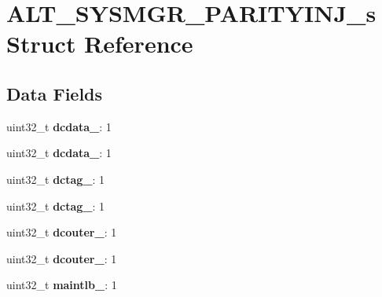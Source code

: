 \hypertarget{structALT__SYSMGR__PARITYINJ__s}{}\section{A\+L\+T\+\_\+\+S\+Y\+S\+M\+G\+R\+\_\+\+P\+A\+R\+I\+T\+Y\+I\+N\+J\+\_\+s Struct Reference}
\label{structALT__SYSMGR__PARITYINJ__s}
\subsection*{Data Fields}
\begin{DoxyCompactItemize}
\item 
\mbox{\label{structALT__SYSMGR__PARITYINJ__s_a3ed85f2d562b9a693c1386f286b104b6}} 
uint32\+\_\+t {\bfseries dcdata\+\_}\+: 1
\item 
\mbox{\label{structALT__SYSMGR__PARITYINJ__s_a4fa96838ecf4bffd9a3acaeb564a2132}} 
uint32\+\_\+t {\bfseries dcdata\+\_}\+: 1
\item 
\mbox{\label{structALT__SYSMGR__PARITYINJ__s_ac8bacf9485ec83e760927d70564068d1}} 
uint32\+\_\+t {\bfseries dctag\+\_}\+: 1
\item 
\mbox{\label{structALT__SYSMGR__PARITYINJ__s_a5fca94339455940c6a8aae10f8850d2b}} 
uint32\+\_\+t {\bfseries dctag\+\_}\+: 1
\item 
\mbox{\label{structALT__SYSMGR__PARITYINJ__s_a39ae8d1b2082937f73ff235fb7254e1b}} 
uint32\+\_\+t {\bfseries dcouter\+\_}\+: 1
\item 
\mbox{\label{structALT__SYSMGR__PARITYINJ__s_a4a0a26fee7aa247e9e7788a0d076c213}} 
uint32\+\_\+t {\bfseries dcouter\+\_}\+: 1
\item 
\mbox{\label{structALT__SYSMGR__PARITYINJ__s_a6763fe41e4ce2db3ac80337547ae92b5}} 
uint32\+\_\+t {\bfseries maintlb\+\_}\+: 1
\item 
\mbox{\label{structALT__SYSMGR__PARITYINJ__s_a1a2caf08ff4f8a1bd54d1438a209629f}} 

\end{DoxyCompactItemize}
